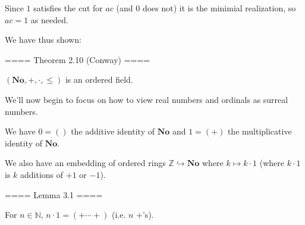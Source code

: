 Since $1$ satisfies the cut for $ac$ (and $0$ does not) it is the minimial realization, so $ac = 1$ as needed.

We have thus shown:

==== Theorem 2.10 (Conway) ====

$(\mathbf{No}, +, \cdot, \leq)$ is an ordered field.

We'll now begin to focus on how to view real numbers and ordinals as surreal numbers.

We have $0 = ()$ the additive identity of $\mathbf{No}$ and $1 = (+)$ the multiplicative identity of $\mathbf{No}$.

We also have an embedding of ordered rings $\mathbb{Z} \hookrightarrow \mathbf{No}$ where $k\mapsto k\cdot 1$ (where $k\cdot 1$ is $k$ additions of $+1$ or $-1$).

==== Lemma 3.1 ====

For $n\in \mathbb{N}$, $n\cdot 1 = (+\cdots +)$ (i.e. $n$ $+$'s).
